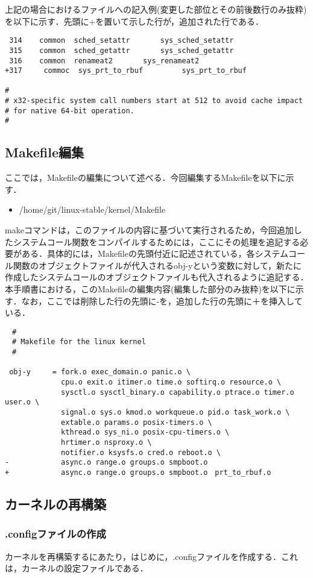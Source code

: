 \documentclass[12pt]{jsarticle}
\begin{document}
上記の場合におけるファイルへの記入例(変更した部位とその前後数行のみ抜粋)を以下に示す．先頭に+を置いて示した行が，追加された行である．
\begin{verbatim}
 314	common	sched_setattr		sys_sched_setattr
 315	common	sched_getattr		sys_sched_getattr
 316	common	renameat2		sys_renameat2
+317     commoc  sys_prt_to_rbuf         sys_prt_to_rbuf

#
# x32-specific system call numbers start at 512 to avoid cache impact
# for native 64-bit operation.
#
\end{verbatim}
\subsection{Makefile編集}
ここでは，Makefileの編集について述べる．今回編集するMakefileを以下に示す．
\begin{itemize}
\item \slash{}home\slash{}git\slash{}linux-stable\slash{}kernel\slash{}Makefile
\end{itemize}
makeコマンドは，このファイルの内容に基づいて実行されるため，今回追加したシステムコール関数をコンパイルするためには，ここにその処理を追記する必要がある．具体的には，Makefileの先頭付近に記述されている，各システムコール関数のオブジェクトファイルが代入されるobj-yという変数に対して，新たに作成したシステムコールのオブジェクトファイルも代入されるように追記する．本手順書における，このMakefileの編集内容(編集した部分のみ抜粋)を以下に示す．なお，ここでは削除した行の先頭に-を，追加した行の先頭に＋を挿入している．

\begin{verbatim}
　#
　# Makefile for the linux kernel
　#
　
 obj-y     = fork.o exec_domain.o panic.o \
             cpu.o exit.o itimer.o time.o softirq.o resource.o \
             sysctl.o sysctl_binary.o capability.o ptrace.o timer.o user.o \
             signal.o sys.o kmod.o workqueue.o pid.o task_work.o \
             extable.o params.o posix-timers.o \
             kthread.o sys_ni.o posix-cpu-timers.o \
             hrtimer.o nsproxy.o \
             notifier.o ksysfs.o cred.o reboot.o \
-            async.o range.o groups.o smpboot.o
+            async.o range.o groups.o smpboot.o　prt_to_rbuf.o
\end{verbatim}

\subsection{カーネルの再構築}
\subsubsection{.configファイルの作成}
カーネルを再構築するにあたり，はじめに，.configファイルを作成する．これは，カーネルの設定ファイルである．
\end{document}
